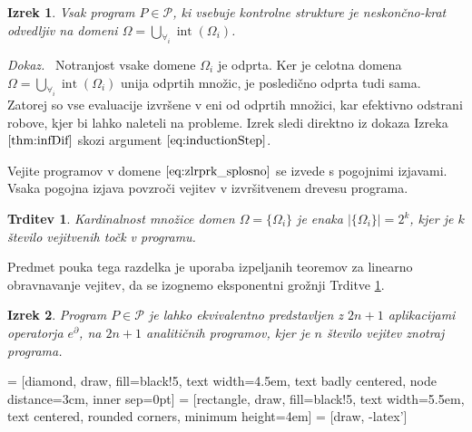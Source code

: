 \documentclass[a4paper, 12pt]{book}
\newcommand{\dP}{\mathcal{P}}
\newcommand{\D}{\partial}
\DeclareMathOperator{\interior}{int}
\newtheorem{izrek}{Izrek}[chapter]
\newtheorem{trditev}{Trditev}[izrek]
\newenvironment{dokaz}{\emph{Dokaz.}\ }{\hspace{\fill}{$\Box$}}
\begin{document}
 \begin{izrek}\label{izr:diferentiableOnDomain}
 Vsak program $P\in\dP$, ki vsebuje kontrolne strukture je neskončno-krat odvedljiv na domeni $\Omega=\bigcup\limits_{\forall_i}\interior(\Omega_i)$.
 \end{izrek}
 \begin{dokaz}
  Notranjost vsake domene $\Omega_i$ je odprta. Ker je celotna domena $\Omega=\bigcup\limits_{\forall_i}\interior(\Omega_i)$ unija odprtih množic, je posledično odprta tudi sama. Zatorej so vse evaluacije izvršene v eni od odprtih množici, kar efektivno odstrani robove, kjer bi lahko naleteli na probleme. Izrek sledi direktno iz dokaza Izreka $\ref{thm:infDif}$ skozi argument $\eqref{eq:inductionStep}$.
 \end{dokaz}
 
Vejite programov v domene $\eqref{eq:zlrprk_splosno}$ se izvede s pogojnimi izjavami. Vsaka pogojna izjava povzroči vejitev v izvršitvenem drevesu programa.

\begin{trditev}\label{izr:st.zlepkov}
Kardinalnost množice domen $\Omega=\{\Omega_i\}$ je enaka $\lvert\{\Omega_i
\}\rvert=2^k$, kjer je $k$ število vejitvenih točk v programu.
\end{trditev}

Predmet pouka tega razdelka je uporaba izpeljanih teoremov za linearno obravnavanje vejitev, da se izognemo eksponentni grožnji Trditve \ref{izr:st.zlepkov}.

\begin{izrek}\label{izr:2n+1}
Program $P\in\dP$ je lahko ekvivalentno predstavljen z $2n+1$
aplikacijami operatorja $e^\D$, na $2n+1$ analitičnih programov, kjer je
$n$ število vejitev znotraj programa.
\end{izrek}
 = [diamond, draw, fill=black!5, 
    text width=4.5em, text badly centered, node distance=3cm, inner sep=0pt]
 = [rectangle, draw, fill=black!5, 
    text width=5.5em, text centered, rounded corners, minimum height=4em]
 = [draw, -latex']
\end{document}
